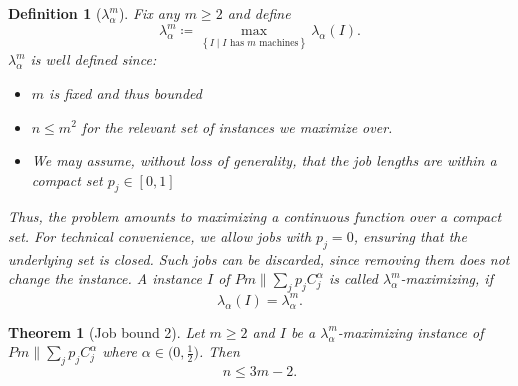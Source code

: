 \documentclass[%
english, titlepage=false %
]{./tum-templates/book/tumbook}
\newtheorem{theorem}{Theorem}
\newtheorem{definition}{Definition}
\begin{document}
\begin{definition}[$\lambda^{m}_{\alpha}$]\label{def:lambda-m}
Fix any $m \ge 2$ and define
\[
 \lambda^{m}_{\alpha} \coloneqq \max_{\left\{ I \mid I \text{ has } m \text{ machines} \right\}}\lambda_{\alpha}(I).
\]
\newline
$\lambda^{m}_{\alpha}$ is well defined since: 
\begin{itemize}
     \item $m$ is fixed and thus bounded
     \item $n \le m^2$ for the relevant set of instances we maximize over. 
     \item We may assume, without loss of generality, that the job lengths are within a compact set $p_j \in [0,1]$
\end{itemize}
Thus, the problem amounts to maximizing a continuous function over a compact set. For technical convenience, we allow jobs with \(p_j=0\), 
ensuring that the underlying set is closed. Such jobs can be discarded, since removing them does not change the instance.
A instance $I$ of $Pm \!\parallel\! \sum_{j} p_jC^{\alpha}_j$ is called $\lambda^m_{\alpha}$-maximizing, 
if 
\[
\lambda_{\alpha}(I) = \lambda^m_{\alpha}.
\]
\end{definition}

\begin{theorem}[Job bound 2]\label{thm:job-bound}
Let $m \ge 2$ and $I$ be a $\lambda_\alpha^m$-maximizing instance of $Pm\!\parallel\!\sum_j p_j C_j^\alpha$ 
where $\alpha \in \Big(0,\frac12\Big)$. Then
\[
    n \le 3m-2.
\]
\end{theorem}
\end{document}
